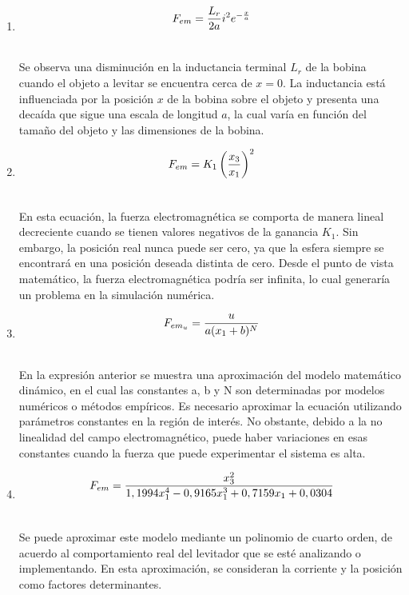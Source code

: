 \begin{enumerate}
    \item {
        \begin{align*}
        &F_{em}=\frac{L_{r}}{2a}i^2e^{-\frac{x}{a}} \\ \thinspace
    \end{align*} 


    Se observa una disminución en la inductancia terminal $L_{r}$ de la bobina cuando el objeto a levitar se encuentra cerca de $x=0$. La inductancia está influenciada por la posición $x$ de la bobina sobre el objeto  y presenta una decaída que sigue una escala de longitud $a$, la cual varía en función del tamaño del objeto y las dimensiones de la bobina.
            
            }
    
    \item {
        \begin{align*}
        &F_{em}=K_{1}\left(\frac{x_{3}}{x_{1}}\right)^2 \\ \thinspace
    \end{align*} 

    En esta ecuación, la fuerza electromagnética se comporta de manera lineal decreciente cuando se tienen valores negativos de la ganancia $K_{1}$. Sin embargo, la posición real nunca puede ser cero, ya que la esfera siempre se encontrará en una posición deseada distinta de cero. Desde el punto de vista matemático, la fuerza electromagnética podría ser infinita, lo cual generaría un problema en la simulación numérica. 

            }

    \item {
        \begin{align*}
        &F_{em_{u}}=\frac{u}{a(x_{1}+b)^N} \\ \thinspace
    \end{align*} 
    
    En la expresión anterior se muestra una aproximación del modelo matemático dinámico, en el cual las constantes a, b y N son determinadas por modelos numéricos o métodos empíricos. Es necesario aproximar la ecuación utilizando parámetros constantes en la región de interés. No obstante, debido a la no linealidad del campo electromagnético, puede haber variaciones en esas constantes cuando la fuerza que puede experimentar el sistema es alta. 
          
          }

    \item {
        \begin{align*}
        &F_{em}=\frac{x_{3}^2}{1,1994x_{1}^4-0,9165x_{1}^3+0,7159x_{1}+0,0304} \\ \thinspace
    \end{align*} 

    Se puede aproximar este modelo mediante un polinomio de cuarto orden, de acuerdo al comportamiento real del levitador que se esté analizando o implementando. En esta aproximación, se consideran la corriente y la posición como factores determinantes.
    
          }

\end{enumerate}
